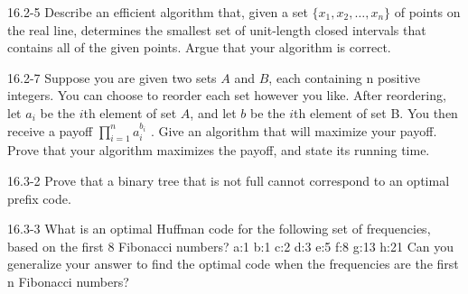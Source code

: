 





\homeworkheader{\classnameandsection}

\begin{problem}{16.2-5}
  Describe an efficient algorithm that, given a set $\{ x_1,x_2,\ldots, x_n \}$ of points on the real line, determines
  the smallest set of unit-length closed intervals that contains all of the given points. Argue that your algorithm is
  correct.
\end{problem}

\begin{problem}{16.2-7}
  Suppose you are given two sets $A$ and $B$, each containing n positive integers. You can choose to reorder each set
however you like. After reordering, let $a_i$ be the $i$th element of set $A$, and let $b$ be the $i$th element of set
B. You then receive a payoff $\displaystyle\prod\limits_{i = 1}^n a_i^{b_i}$ . Give an algorithm that will maximize your
   payoff. Prove that your algorithm maximizes the payoff, and state its running time.
\end{problem}

\begin{problem}{16.3-2}
  Prove that a binary tree that is not full cannot correspond to an optimal prefix code.
\end{problem}

\begin{problem}{16.3-3}
  What is an optimal Huffman code for the following set of frequencies, based on the first 8 Fibonacci numbers?
  \br
  a:1 b:1 c:2 d:3 e:5 f:8 g:13 h:21
  \br
  Can you generalize your answer to find the optimal code when the frequencies are the first n Fibonacci numbers?
\end{problem}



